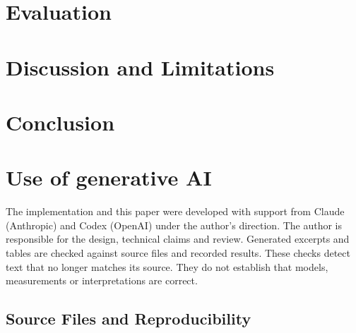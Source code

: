 \section{Evaluation}\label{sec:evaluation}

\section{Discussion and Limitations}\label{sec:discussion}

\section{Conclusion}\label{sec:conclusion}


\section*{Use of generative AI}\label{sec:ai}
The implementation and this paper were developed with support from
Claude (Anthropic) and Codex (OpenAI) under the author's direction.
The author is responsible for the design, technical claims and review.
Generated excerpts and tables are checked against source files and
recorded results. These checks detect text that no longer matches its
source. They do not establish that models, measurements or interpretations
are correct.




\clearpage
\begin{appendices}
\section{Source Files and Reproducibility}\label{app:reproduce}

\end{appendices}



